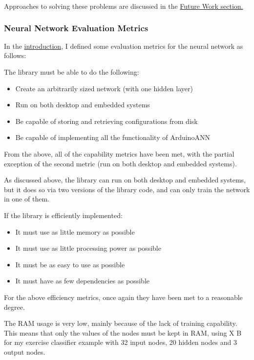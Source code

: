 \documentclass[a4paper]{article}
\begin{document}
Approaches to solving these problems are discussed in the \hyperref[subsec:fw_futurework]{Future Work section.}

\subsubsection{Neural Network Evaluation Metrics}

In the \hyperref[subsubsec:in_cs_nnmetrics]{introduction}, I defined some evaluation metrics for the neural network as follows:

The library must be able to do the following:

\begin{itemize}
\item Create an arbitrarily sized network (with one hidden layer)
\item Run on both desktop and embedded systems
\item Be capable of storing and retrieving configurations from disk
\item Be capable of implementing all the functionality of ArduinoANN
\end{itemize}

From the above, all of the capability metrics have been met, with the partial exception of the second metric (run on both desktop and embedded systems).

As discussed above, the library can run on both desktop and embedded systems, but it does so via two versions of the library code, and can only train the network in one of them.

If the library is efficiently implemented:

\begin{itemize}
\item It must use as little memory as possible
\item It must use as little processing power as possible
\item It must be as easy to use as possible
\item It must have as few dependencies as possible
\end{itemize}

For the above efficiency metrics, once again they have been met to a reasonable degree. 

The RAM usage is very low, mainly because of the lack of training capability. This means that only the values of the nodes must be kept in RAM, using X B for my exercise classifier example with 32 input nodes, 20 hidden nodes and 3 output nodes.
\end{document}
